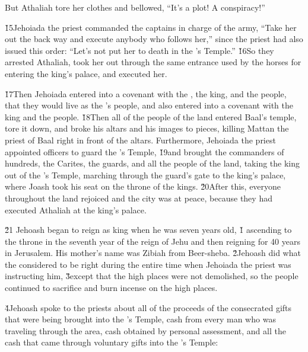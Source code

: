 But Athaliah tore her clothes and bellowed, ``It's a plot! A conspiracy!''

\v{15}Jehoiada the priest commanded the captains in charge of the army, ``Take her out the back way and execute anybody who follows her,'' since the priest had also issued this order: ``Let's not put her to death in the 's Temple.'' \v{16}So they arrested Athaliah, took her out through the same entrance used by the horses for entering the king's palace, and executed her.

\v{17}Then Jehoiada entered into a covenant with the , the king, and the people, that they would live as the 's people, and also entered into a covenant with the king and the people. \v{18}Then all of the people of the land entered Baal's temple, tore it down, and broke his altars and his images to pieces, killing Mattan the priest of Baal right in front of the altars. Furthermore, Jehoiada the priest appointed officers to guard the 's Temple, \v{19}and brought the commanders of hundreds, the Carites, the guards, and all the people of the land, taking the king out of the 's Temple, marching through the guard's gate to the king's palace, where Joash took his seat on the throne of the kings. \v{20}After this, everyone throughout the land rejoiced and the city was at peace, because they had executed Athaliah at the king's palace.

\v{21} Jehoash began to reign as king when he was seven years old,
\v{1} ascending to the throne in the seventh year of the reign of Jehu and then reigning for 40 years in Jerusalem. His mother's name was Zibiah from Beer-sheba. \v{2}Jehoash did what the  considered to be right during the entire time when Jehoiada the priest was instructing him, \v{3}except that the high places were not demolished, so the people continued to sacrifice and burn incense on the high places.

\v{4}Jehoash spoke to the priests about all of the proceeds of the consecrated gifts that were being brought into the 's Temple, cash from every man who was traveling through the area, cash obtained by personal assessment, and all the cash that came through voluntary gifts into the 's Temple:

